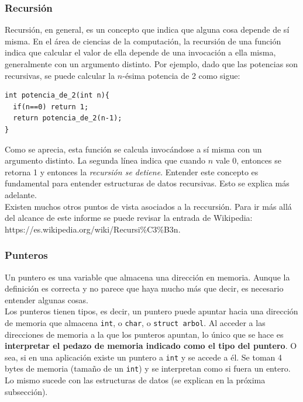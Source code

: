 \documentclass[12pt,letterpaper]{report}
\begin{document}
\subsubsection{Recursión}

Recursión, en general, es un concepto que indica que alguna cosa depende de sí misma. En el área de ciencias de la computación, la recursión de una función indica que calcular el valor de ella depende de una invocación a ella misma, generalmente con un argumento distinto. Por ejemplo, dado que las potencias son recursivas, se puede calcular la $n$-ésima potencia de 2 como sigue:

\begin{verbatim}
int potencia_de_2(int n){
  if(n==0) return 1;
  return potencia_de_2(n-1);
}
\end{verbatim}

Como se aprecia, esta función se calcula invocándose a sí misma con un argumento distinto. La segunda línea indica que cuando $n$ vale 0, entonces se retorna 1 y entonces la \emph{recursión se detiene}. Entender este concepto es fundamental para entender estructuras de datos recursivas. Esto se explica más adelante.\\

Existen muchos otros puntos de vista asociados a la reccursión. Para ir más allá del alcance de este informe se puede revisar la entrada de Wikipedia: https://es.wikipedia.org/wiki/Recursi\%C3\%B3n.

\subsubsection{Punteros}
Un puntero es una variable que almacena una dirección en memoria. Aunque la definición es correcta y no parece que haya mucho más que decir, es necesario entender algunas cosas.\\

Los punteros tienen tipos, es decir, un puntero puede apuntar hacia una dirección de memoria que almacena \texttt{int}, o \texttt{char}, o \texttt{struct arbol}. Al acceder a las direcciones de memoria a la que los punteros apuntan, lo único que se hace es \textbf{interpretar el pedazo de memoria indicado como el tipo del puntero}. O sea, si en una aplicación existe un puntero a \texttt{int} y se accede a él. Se toman 4 bytes de memoria (tamaño de un \texttt{int}) y se interpretan como si fuera un entero. Lo mismo sucede con las estructuras de datos (se explican en la próxima subsección).\\
\end{document}
